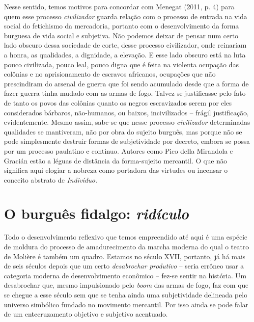 Nesse sentido, temos motivos para concordar com Menegat (2011, p. 4)
para quem esse processo \emph{civilizador} guarda relação com o processo
de entrada na vida social do fetichismo da mercadoria, portanto com o
desenvolvimento da forma burguesa de vida social e subjetiva. Não
podemos deixar de pensar num certo lado obscuro dessa sociedade de
corte, desse processo civilizador, onde reinariam a honra, as
qualidades, a dignidade, a elevação. E esse lado obscuro está na luta
pouco civilizada, pouco leal, pouco digna que é feita na violenta
ocupação das colônias e no aprisionamento de escravos africanos,
ocupações que não prescindiram do arsenal de guerra que foi sendo
acumulado desde que a forma de fazer guerra tinha mudado com as armas de
fogo. Talvez se justificasse pelo fato de tanto os povos das colônias
quanto os negros escravizados serem por eles considerados bárbaros,
não-humanos, ou baixos, incivilizados -- frágil justificação,
evidentemente. Mesmo assim, sabe-se que nesse processo
\emph{civilizador} determinadas qualidades se mantiveram, não por obra
do sujeito burguês, mas porque não se pode simplesmente destruir formas
de subjetividade por decreto, embora se possa por um processo paulatino
e contínuo. Autores como Pico della Mirandola e Gracián estão a léguas
de distância da forma-sujeito mercantil. O que não significa aqui
elogiar a nobreza como portadora das virtudes ou incensar o conceito
abstrato de \emph{Indivíduo.}

\section{O burguês fidalgo: \emph{ridículo}}

Todo o desenvolvimento reflexivo que temos empreendido até aqui é uma
espécie de moldura do processo de amadurecimento da marcha moderna do
qual o teatro de Molière é também um quadro. Estamos no século XVII,
portanto, já há mais de seis séculos depois que um certo
\emph{desabrochar produtivo} -- seria errôneo usar a categoria moderna
de desenvolvimento econômico -- fez-se sentir na história. Um
desabrochar que, mesmo impulsionado pelo \emph{boom} das armas de fogo,
faz com que se chegue a esse século sem que se tenha ainda uma
subjetividade delineada pelo universo simbólico fundado no movimento
mercantil. Por isso ainda se pode falar de um entecruzamento objetivo e
subjetivo acentuado.

